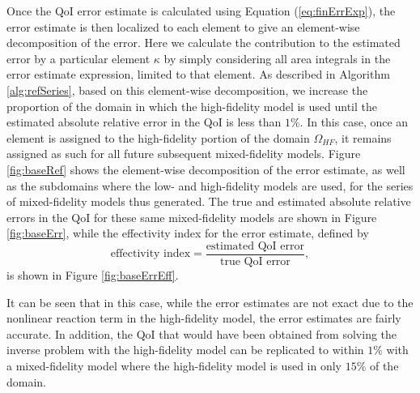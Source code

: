 Once the QoI error estimate is calculated using Equation (\ref{eq:finErrExp}), the error estimate is then localized to each element to give an element-wise decomposition of the error. Here we calculate the contribution to the estimated error by a particular element $\kappa$ by simply considering all area integrals in the error estimate expression, limited to that element. As described in Algorithm \ref{alg:refSeries}, based on this element-wise decomposition, we increase the proportion of the domain in which the high-fidelity model is used until the estimated absolute relative error in the QoI is less than $1\%$. In this case, once an element is assigned to the high-fidelity portion of the domain $\Omega_{HF}$, it remains assigned as such for all future subsequent mixed-fidelity models. Figure \ref{fig:baseRef} shows the element-wise decomposition of the error estimate, as well as the subdomains where the low- and high-fidelity models are used, for the series of mixed-fidelity models thus generated. The true and estimated absolute relative errors in the QoI for these same mixed-fidelity models are shown in Figure \ref{fig:baseErr}, while the effectivity index for the error estimate, defined by
\begin{equation}
\textrm{effectivity index}=\frac{\textrm{estimated QoI error}}{\textrm{true QoI error}},
\end{equation}
is shown in Figure \ref{fig:baseErrEff}.

It can be seen that in this case, while the error estimates are not exact due to the nonlinear reaction term in the high-fidelity model, the error estimates are fairly accurate. In addition, the QoI that would have been obtained from solving the inverse problem with the high-fidelity model can be replicated to within $1\%$ with a mixed-fidelity model where the high-fidelity model is used in only $15\%$ of the domain.

